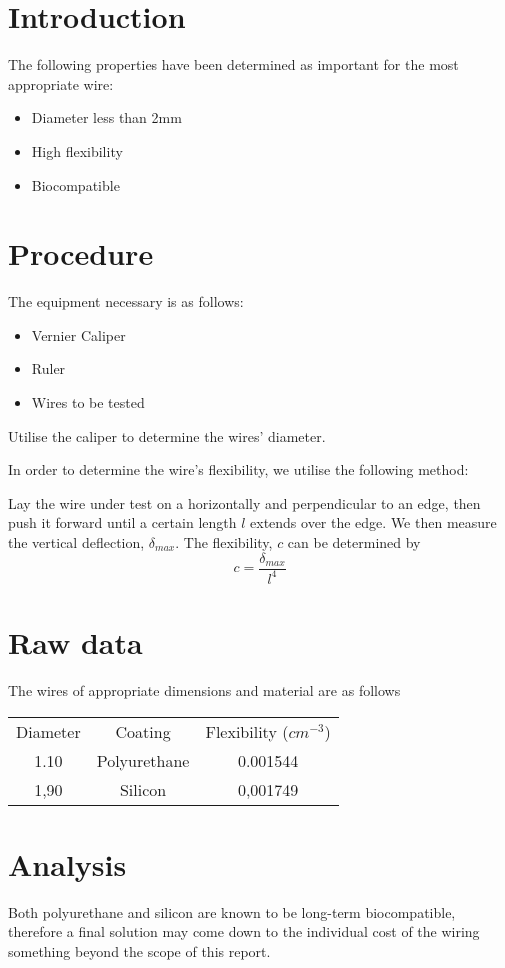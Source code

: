 \documentclass{article}
\begin{document}
\section{Introduction}
The following properties have been determined as important for the most appropriate wire:
\begin{itemize}
	\item Diameter less than 2mm
	\item High flexibility
	\item Biocompatible
\end{itemize}

\section{Procedure}
The equipment necessary is as follows:
\begin{itemize}
	\item Vernier Caliper
	\item Ruler
	\item Wires to be tested
\end{itemize}
Utilise the caliper to determine the wires' diameter.

In order to determine the wire's flexibility, we utilise the following method:
	
Lay the wire under test on a horizontally and perpendicular to an edge, then push it forward until a certain length $l$ extends over the edge. We then measure the vertical deflection, $\delta_{max} $. The flexibility, $c$ can be determined by
	\begin{equation}
	c = \frac{\delta_{max}}{l^4}
	\end{equation}		

\section{Raw data}
The wires of appropriate dimensions and material are as follows
\begin{table}[h]
	\begin{tabular}{c|c|c|}
		Diameter & Coating & Flexibility ($cm^{-3}$) \\
		1.10 & Polyurethane & 0.001544 \\
		1,90 & Silicon & 0,001749
	\end{tabular}
\end{table}
\section{Analysis}
Both polyurethane and silicon are known to be long-term biocompatible, therefore a final solution may come down to the individual cost of the wiring \textendash something beyond the scope of this report.
\end{document}
